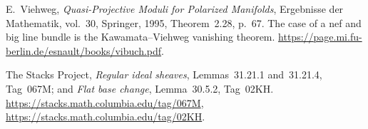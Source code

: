 E.~Viehweg, \emph{Quasi-Projective Moduli for Polarized Manifolds},
Ergebnisse der Mathematik, vol.~30, Springer, 1995,
Theorem~2.28, p.~67.  The case of a nef and big line bundle is the
Kawamata--Viehweg vanishing theorem.
\url{https://page.mi.fu-berlin.de/esnault/books/vibuch.pdf}.

The Stacks Project, \emph{Regular ideal sheaves},
Lemmas~31.21.1 and~31.21.4, Tag~067M; and \emph{Flat base change},
Lemma~30.5.2, Tag~02KH.
\url{https://stacks.math.columbia.edu/tag/067M},
\url{https://stacks.math.columbia.edu/tag/02KH}.
